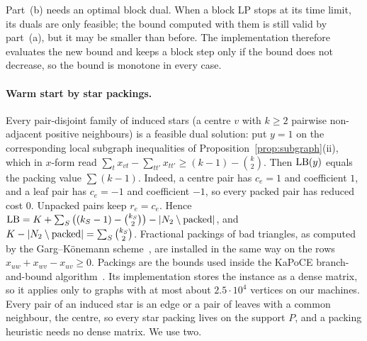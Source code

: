 Part~(b) needs an optimal block dual.  When a block LP stops at its time limit,
its duals are only feasible; the bound computed with them is still valid by
part~(a), but it may be smaller than before.  The implementation therefore
evaluates the new bound and keeps a block step only if the bound does not
decrease, so the bound is monotone in every case.

\paragraph{Warm start by star packings.}  Every pair-disjoint family of
induced stars (a centre $v$ with $k\ge2$ pairwise non-adjacent positive
neighbours) is a feasible dual solution: put $y=1$ on the corresponding
local subgraph inequalities of Proposition~\ref{prop:subgraph}(ii), which in
$x$-form read $\sum_t x_{vt}-\sum_{tt'}x_{tt'}\ge (k-1)-\binom k2$.  Then
$\mathrm{LB}(y)$ equals the packing value $\sum(k-1)$.  Indeed, a centre pair has
$c_e=1$ and coefficient $1$, and a leaf pair has $c_e=-1$ and coefficient
$-1$, so every packed pair has reduced cost $0$.  Unpacked pairs keep
$r_e=c_e$.  Hence $\mathrm{LB}=K+\sum_S\big((k_S-1)-\binom{k_S}2\big)-|N_{2}\setminus
\text{packed}|$, and $K-|N_{2}\setminus\text{packed}|=\sum_S\binom{k_S}{2}$.
Fractional packings of bad triangles, as computed by the Garg--K\"onemann
scheme~\citep{GargK07,Fleischer00}, are installed in the same way on the
rows $x_{uw}+x_{wv}-x_{uv}\ge0$.
Packings are the bounds used inside the KaPoCE branch-and-bound
algorithm~\citep{BlasiusEtAl22sea}.  Its implementation stores the instance
as a dense matrix, so it applies only to graphs with at most about
$2.5\cdot10^4$ vertices on our machines.  Every pair of an induced star is an
edge or a pair of leaves with a common neighbour, the centre, so every star
packing lives on the support $P$, and a packing heuristic needs no dense
matrix.  We use two.

